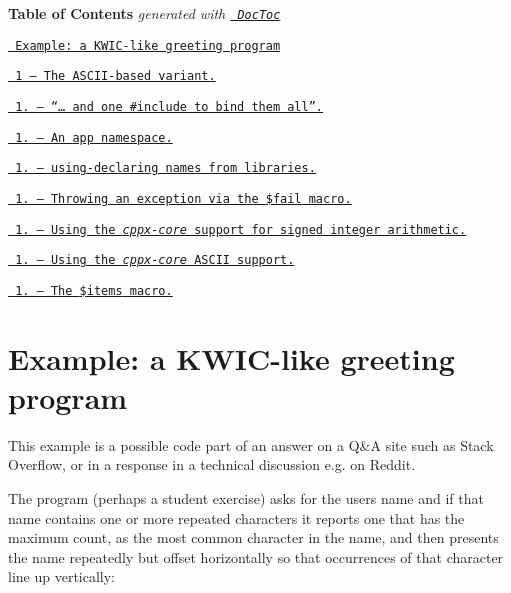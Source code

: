 {\bfseries{Table of Contents}} {\itshape generated with \href{https://github.com/thlorenz/doctoc}{\texttt{ Doc\+Toc}}}


\begin{DoxyItemize}
\item \href{\#example-a-kwic-like-greeting-program}{\texttt{ Example\+: a K\+W\+I\+C-\/like greeting program}}
\begin{DoxyItemize}
\item \href{\#1--the-ascii-based-variant}{\texttt{ 1 – The A\+S\+C\+I\+I-\/based variant.}}
\item \href{\#11---and-one-include-to-bind-them-all}{\texttt{ 1. – “… and one {\ttfamily \#include} to bind them all”.}}
\item \href{\#12--an-app-namespace}{\texttt{ 1. – An {\ttfamily app} namespace.}}
\item \href{\#13--using-declaring-names-from-libraries}{\texttt{ 1. – {\ttfamily using}-\/declaring names from libraries.}}
\item \href{\#14--throwing-an-exception-via-the-fail-macro}{\texttt{ 1. – Throwing an exception via the {\ttfamily \$fail} macro.}}
\item \href{\#15---using-the-cppx-core-support-for-signed-integer-arithmetic}{\texttt{ 1. – Using the {\itshape cppx-\/core} support for signed integer arithmetic.}}
\item \href{\#16--using-the-cppx-core-ascii-support}{\texttt{ 1. – Using the {\itshape cppx-\/core} A\+S\+C\+II support.}}
\item \href{\#17--the-items-macro}{\texttt{ 1. – The {\ttfamily \$items} macro.}}
\end{DoxyItemize}
\end{DoxyItemize}

\section*{Example\+: a K\+W\+I\+C-\/like greeting program}

This example is a possible code part of an answer on a Q\&A site such as Stack Overflow, or in a response in a technical discussion e.\+g. on Reddit.

The program (perhaps a student exercise) asks for the user\textquotesingle{}s name and if that name contains one or more repeated characters it reports one that has the maximum count, as the most common character in the name, and then presents the name repeatedly but offset horizontally so that occurrences of that character line up vertically\+:

